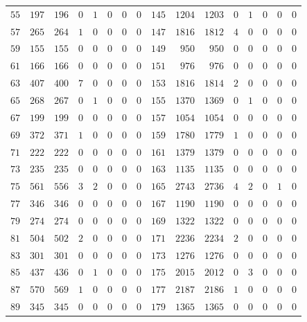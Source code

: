\documentclass[11pt]{amsart}
\theoremstyle{remark}
\begin{document}
\begin{center}
\begin{tabular}{rrrrrrrr|rrrrrrrr}
$55$ & $197$ & $196$ & $0$ & $1$ & $0$ & $0$ & $0$ & $145$ & $1204$ & $1203$ & $0$ & $1$ & $0$ & $0$ & $0$ \\
$57$ & $265$ & $264$ & $1$ & $0$ & $0$ & $0$ & $0$ & $147$ & $1816$ & $1812$ & $4$ & $0$ & $0$ & $0$ & $0$ \\
$59$ & $155$ & $155$ & $0$ & $0$ & $0$ & $0$ & $0$ & $149$ & $950$ & $950$ & $0$ & $0$ & $0$ & $0$ & $0$ \\
$61$ & $166$ & $166$ & $0$ & $0$ & $0$ & $0$ & $0$ & $151$ & $976$ & $976$ & $0$ & $0$ & $0$ & $0$ & $0$ \\
$63$ & $407$ & $400$ & $7$ & $0$ & $0$ & $0$ & $0$ & $153$ & $1816$ & $1814$ & $2$ & $0$ & $0$ & $0$ & $0$ \\
$65$ & $268$ & $267$ & $0$ & $1$ & $0$ & $0$ & $0$ & $155$ & $1370$ & $1369$ & $0$ & $1$ & $0$ & $0$ & $0$ \\
$67$ & $199$ & $199$ & $0$ & $0$ & $0$ & $0$ & $0$ & $157$ & $1054$ & $1054$ & $0$ & $0$ & $0$ & $0$ & $0$ \\
$69$ & $372$ & $371$ & $1$ & $0$ & $0$ & $0$ & $0$ & $159$ & $1780$ & $1779$ & $1$ & $0$ & $0$ & $0$ & $0$ \\
$71$ & $222$ & $222$ & $0$ & $0$ & $0$ & $0$ & $0$ & $161$ & $1379$ & $1379$ & $0$ & $0$ & $0$ & $0$ & $0$ \\
$73$ & $235$ & $235$ & $0$ & $0$ & $0$ & $0$ & $0$ & $163$ & $1135$ & $1135$ & $0$ & $0$ & $0$ & $0$ & $0$ \\
$75$ & $561$ & $556$ & $3$ & $2$ & $0$ & $0$ & $0$ & $165$ & $2743$ & $2736$ & $4$ & $2$ & $0$ & $1$ & $0$ \\
$77$ & $346$ & $346$ & $0$ & $0$ & $0$ & $0$ & $0$ & $167$ & $1190$ & $1190$ & $0$ & $0$ & $0$ & $0$ & $0$ \\
$79$ & $274$ & $274$ & $0$ & $0$ & $0$ & $0$ & $0$ & $169$ & $1322$ & $1322$ & $0$ & $0$ & $0$ & $0$ & $0$ \\
$81$ & $504$ & $502$ & $2$ & $0$ & $0$ & $0$ & $0$ & $171$ & $2236$ & $2234$ & $2$ & $0$ & $0$ & $0$ & $0$ \\
$83$ & $301$ & $301$ & $0$ & $0$ & $0$ & $0$ & $0$ & $173$ & $1276$ & $1276$ & $0$ & $0$ & $0$ & $0$ & $0$ \\
$85$ & $437$ & $436$ & $0$ & $1$ & $0$ & $0$ & $0$ & $175$ & $2015$ & $2012$ & $0$ & $3$ & $0$ & $0$ & $0$ \\
$87$ & $570$ & $569$ & $1$ & $0$ & $0$ & $0$ & $0$ & $177$ & $2187$ & $2186$ & $1$ & $0$ & $0$ & $0$ & $0$ \\
$89$ & $345$ & $345$ & $0$ & $0$ & $0$ & $0$ & $0$ & $179$ & $1365$ & $1365$ & $0$ & $0$ & $0$ & $0$ & $0$ \\

\end{tabular}
\end{center}
\end{document}
